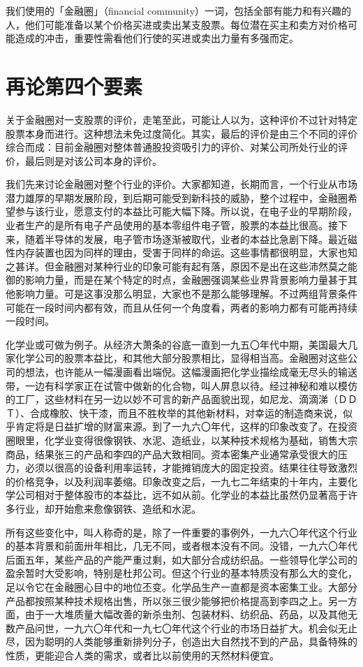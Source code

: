 \documentclass[UTF8,a4paper,zihao=-4,fontset = windows]{ctexart} %
\begin{document}
我们使用的「金融圈」（financial community）一词，包括全部有能力和有兴趣的人，他们可能准备以某个价格买进或卖出某支股票。每位潜在买主和卖方对价格可能造成的冲击，重要性需看他们行使的买进或卖出力量有多强而定。

\section{再论第四个要素}

关于金融圈对一支股票的评价，走笔至此，可能让人以为，这种评价不过针对特定股票本身而进行。这种想法未免过度简化。其实，最后的评价是由三个不同的评价综合而成：目前金融圈对整体普通股投资吸引力的评价、对某公司所处行业的评价，最后则是对该公司本身的评价。

我们先来讨论金融圈对整个行业的评价。大家都知道，长期而言，一个行业从市场潜力雄厚的早期发展阶段，到后期可能受到新科技的威胁，整个过程中，金融圈希望参与该行业，愿意支付的本益比可能大幅下降。所以说，在电子业的早期阶段，业者生产的是所有电子产品使用的基本零组件电子管，股票的本益比很高。接下来，随着半导体的发展，电子管市场逐渐被取代，业者的本益比急剧下降。最近磁性内存装置也因为同样的理由，受害于同样的命运。这些事情都很明显，大家也知之甚详。但金融圈对某种行业的印象可能有起有落，原因不是出在这些沛然莫之能御的影响力量，而是在某个特定的时点，金融圈强调某些业界背景影响力量甚于其他影响力量。可是这事没那么明显，大家也不是那么能够理解。不过两组背景条件可能在一段时间内都有效，而且从任何一个角度看，两者的影响力都有可能再持续一段时间。

化学业或可做为例子。从经济大萧条的谷底一直到一九五〇年代中期，美国最大几家化学公司的股票本益比，和其他大部分股票相比，显得相当高。金融圈对这些公司的想法，也许能从一幅漫画看出端倪。这幅漫画把化学业描绘成毫无尽头的输送带，一边有科学家正在试管中做新的化合物，叫人屏息以待。经过神秘和难以模仿的工厂，这些材料在另一边以妙不可言的新产品面貌出现，如尼龙、滴滴涕（ＤＤＴ）、合成橡胶、快干漆，而且不胜枚举的其他新材料，对幸运的制造商来说，似乎肯定将是日益扩增的财富来源。到了一九六〇年代，这样的印象改变了。在投资圈眼里，化学业变得很像钢铁、水泥、造纸业，以某种技术规格为基础，销售大宗商品，结果张三的产品和李四的产品大致相同。资本密集产业通常承受很大的压力，必须以很高的设备利用率运转，才能摊销庞大的固定投资。结果往往导致激烈的价格竞争，以及利润率萎缩。印象改变之后，一九七二年结束的十年内，主要化学公司相对于整体股市的本益比，远不如从前。化学业的本益比虽然仍显著高于许多行业，却开始愈来愈像钢铁、造纸和水泥。

所有这些变化中，叫人称奇的是，除了一件重要的事例外，一九六〇年代这个行业的基本背景和前面卅年相比，几无不同，或者根本没有不同。没错，一九六〇年代后面五年，某些产品的产能严重过剩，如大部分合成纺织品。一些领导化学公司的盈余暂时大受影响，特别是杜邦公司。但这个行业的基本特质没有那么大的变化，足以令它在金融圈心目中的地位丕变。化学品生产一直都是资本密集工业。大部分产品都按照某种技术规格出售，所以张三很少能够把价格提高到李四之上。另一方面，由于一大堆质量大幅改善的新杀虫剂、包装材料、纺织品、药品，以及其他无数产品问世，一九六〇年代和一九七〇年代这个行业的市场日益扩大。机会似无止尽，因为聪明的人类能够重新排列分子，创造出大自然找不到的产品，具备特殊的性质，更能迎合人类的需求，或者比以前使用的天然材料便宜。
\end{document}
